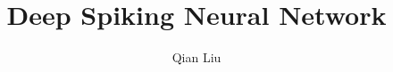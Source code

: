 \documentclass[12pt,PhD,twoside]{muthesis}
\begin{document}

\title{Deep Spiking Neural Network} %
\author{Qian Liu}

\beforeabstract



{}














%

\end{document}
